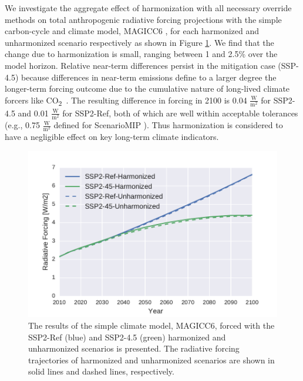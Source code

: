 \documentclass[review]{elsarticle}
\newcommand{\cotwo}{CO\textsubscript{2}~}
\begin{document}
We investigate the aggregate effect of harmonization with all necessary override
methods on total anthropogenic radiative forcing projections with the simple
carbon-cycle and climate model, MAGICC6 \cite{meinshausen2011emulating,
  meinshausen2011rcp}, for each harmonized and unharmonized scenario
respectively as shown in Figure \ref{fig:forcing}. We find that the change due
to harmonization is small, ranging between 1 and 2.5\% over the model
horizon. Relative near-term differences persist in the mitigation case (SSP-4.5)
because differences in near-term emissions define to a larger degree the
longer-term forcing outcome due to the cumulative nature of long-lived climate
forcers like \cotwo.  The resulting difference in forcing in 2100 is 0.04
$\frac{\text{W}}{\text{m}^2}$ for SSP2-4.5 and 0.01
$\frac{\text{W}}{\text{m}^2}$ for SSP2-Ref, both of which are well within
acceptable tolerances (e.g., 0.75 $\frac{\text{W}}{\text{m}^2}$ defined for
ScenarioMIP \cite{oneill_scenario_2016}). Thus harmonization is considered to
have a negligible effect on key long-term climate indicators.

\begin{figure}
  \begin{center}
    \includegraphics[width=\textwidth]{results_forcing.pdf}
    \caption[]{
      \label{fig:forcing}
      The results of the simple climate model, MAGICC6, forced with the SSP2-Ref
      (blue) and SSP2-4.5 (green) harmonized and unharmonized scenarios is
      presented. The radiative forcing trajectories of harmonized and
      unharmonized scenarios are shown in solid lines and dashed lines,
      respectively.  }
  \end{center}
\end{figure}
\end{document}
